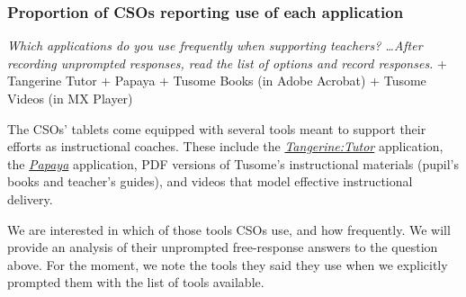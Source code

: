 \documentclass[11pt]{article}
\begin{document}
    \hypertarget{proportion-of-csos-reporting-use-of-each-application}{%
\subsubsection{Proportion of CSOs reporting use of each
application}\label{proportion-of-csos-reporting-use-of-each-application}}

\emph{Which applications do you use frequently when supporting teachers?
\ldots{}After recording unprompted responses, read the list of options
and record responses.} + Tangerine Tutor + Papaya + Tusome Books (in
Adobe Acrobat) + Tusome Videos (in MX Player)

The CSOs' tablets come equipped with several tools meant to support
their efforts as instructional coaches. These include the
\href{http://www.tangerinecentral.org/tutor/}{\emph{Tangerine:Tutor}}
application, the
\href{http://schoolsnetkenya.com/tusome-early-literacy-programme-sounds-application/}{\emph{Papaya}}
application, PDF versions of Tusome's instructional materials (pupil's
books and teacher's guides), and videos that model effective
instructional delivery.

We are interested in which of those tools CSOs use, and how frequently.
We will provide an analysis of their unprompted free-response answers to
the question above. For the moment, we note the tools they said they use
when we explicitly prompted them with the list of tools available.
\end{document}
